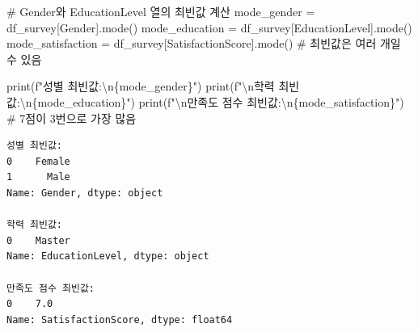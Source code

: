 \documentclass[
  letterpaper,
]{book}
\newenvironment{Shaded}{\begin{snugshade}}{\end{snugshade}}
\newcommand{\BuiltInTok}[1]{\textcolor[rgb]{0.00,0.23,0.31}{#1}}
\newcommand{\CharTok}[1]{\textcolor[rgb]{0.13,0.47,0.30}{#1}}
\newcommand{\CommentTok}[1]{\textcolor[rgb]{0.37,0.37,0.37}{#1}}
\newcommand{\NormalTok}[1]{\textcolor[rgb]{0.00,0.23,0.31}{#1}}
\newcommand{\OperatorTok}[1]{\textcolor[rgb]{0.37,0.37,0.37}{#1}}
\newcommand{\SpecialCharTok}[1]{\textcolor[rgb]{0.37,0.37,0.37}{#1}}
\newcommand{\SpecialStringTok}[1]{\textcolor[rgb]{0.13,0.47,0.30}{#1}}
\newcommand{\StringTok}[1]{\textcolor[rgb]{0.13,0.47,0.30}{#1}}
\begin{document}
\begin{Shaded}
\begin{Highlighting}[]
    \CommentTok{\# Gender와 EducationLevel 열의 최빈값 계산}
\NormalTok{    mode\_gender }\OperatorTok{=}\NormalTok{ df\_survey[}\StringTok{\textquotesingle{}Gender\textquotesingle{}}\NormalTok{].mode()}
\NormalTok{    mode\_education }\OperatorTok{=}\NormalTok{ df\_survey[}\StringTok{\textquotesingle{}EducationLevel\textquotesingle{}}\NormalTok{].mode()}
\NormalTok{    mode\_satisfaction }\OperatorTok{=}\NormalTok{ df\_survey[}\StringTok{\textquotesingle{}SatisfactionScore\textquotesingle{}}\NormalTok{].mode() }\CommentTok{\# 최빈값은 여러 개일 수 있음}

    \BuiltInTok{print}\NormalTok{(}\SpecialStringTok{f"성별 최빈값:}\CharTok{\textbackslash{}n}\SpecialCharTok{\{}\NormalTok{mode\_gender}\SpecialCharTok{\}}\SpecialStringTok{"}\NormalTok{)}
    \BuiltInTok{print}\NormalTok{(}\SpecialStringTok{f"}\CharTok{\textbackslash{}n}\SpecialStringTok{학력 최빈값:}\CharTok{\textbackslash{}n}\SpecialCharTok{\{}\NormalTok{mode\_education}\SpecialCharTok{\}}\SpecialStringTok{"}\NormalTok{)}
    \BuiltInTok{print}\NormalTok{(}\SpecialStringTok{f"}\CharTok{\textbackslash{}n}\SpecialStringTok{만족도 점수 최빈값:}\CharTok{\textbackslash{}n}\SpecialCharTok{\{}\NormalTok{mode\_satisfaction}\SpecialCharTok{\}}\SpecialStringTok{"}\NormalTok{) }\CommentTok{\# 7점이 3번으로 가장 많음}
\end{Highlighting}
\end{Shaded}

\begin{verbatim}
성별 최빈값:
0    Female
1      Male
Name: Gender, dtype: object

학력 최빈값:
0    Master
Name: EducationLevel, dtype: object

만족도 점수 최빈값:
0    7.0
Name: SatisfactionScore, dtype: float64
\end{verbatim}
\end{document}
